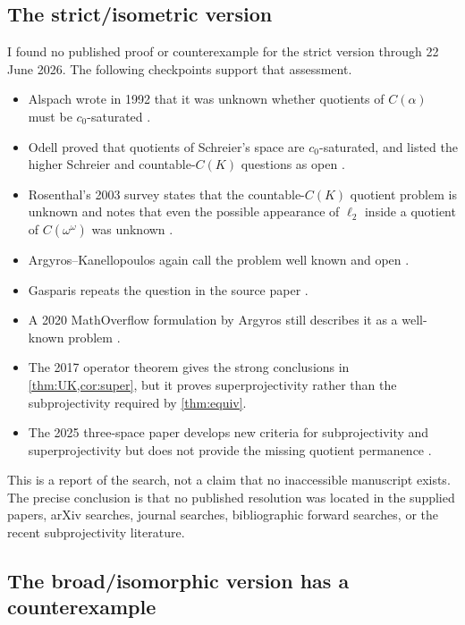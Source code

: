 \documentclass[11pt]{article}
\theoremstyle{definition}
\begin{document}
\subsection{The strict/isometric version}

I found no published proof or counterexample for the strict version through
22 June 2026.  The following checkpoints support that assessment.

\begin{itemize}
\item Alspach wrote in 1992 that it was unknown whether quotients of
      $C(\alpha)$ must be $c_0$-saturated \cite{Alspach1993}.
\item Odell proved that quotients of Schreier's space are $c_0$-saturated,
      and listed the higher Schreier and countable-$C(K)$ questions as open
      \cite{Odell1992}.
\item Rosenthal's 2003 survey states that the countable-$C(K)$ quotient
      problem is unknown and notes that even the possible appearance of
      $\ell_2$ inside a quotient of $C(\omega^\omega)$ was unknown
      \cite{Rosenthal2003}.
\item Argyros--Kanellopoulos again call the problem well known and open
      \cite[Remark~4]{ArgyrosKanellopoulos2005}.
\item Gasparis repeats the question in the source paper
      \cite[p.~492]{Gasparis2009}.
\item A 2020 MathOverflow formulation by Argyros still describes it as a
      well-known problem \cite{MathOverflow2020}.
\item The 2017 operator theorem gives the strong conclusions in
      \cref{thm:UK,cor:super}, but it proves superprojectivity rather than the
      subprojectivity required by \cref{thm:equiv}.
\item The 2025 three-space paper develops new criteria for subprojectivity
      and superprojectivity but does not provide the missing quotient
      permanence \cite{GonzalezPello2025}.
\end{itemize}

This is a report of the search, not a claim that no inaccessible manuscript
exists.  The precise conclusion is that no published resolution was located
in the supplied papers, arXiv searches, journal searches, bibliographic
forward searches, or the recent subprojectivity literature.

\subsection{The broad/isomorphic version has a counterexample}
\end{document}
